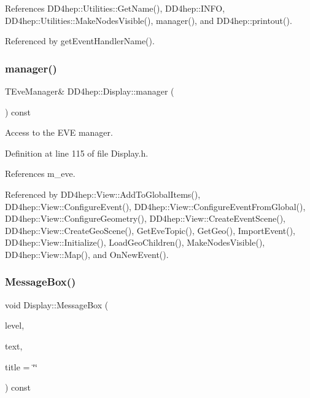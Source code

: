 References D\+D4hep\+::\+Utilities\+::\+Get\+Name(), D\+D4hep\+::\+I\+N\+FO, D\+D4hep\+::\+Utilities\+::\+Make\+Nodes\+Visible(), manager(), and D\+D4hep\+::printout().



Referenced by get\+Event\+Handler\+Name().

\hypertarget{class_d_d4hep_1_1_display_aab28a35f743661ba4f81856ffd22934a}{}\label{class_d_d4hep_1_1_display_aab28a35f743661ba4f81856ffd22934a} 
\subsubsection{\texorpdfstring{manager()}{manager()}}
{\footnotesize\ttfamily T\+Eve\+Manager\& D\+D4hep\+::\+Display\+::manager (\begin{DoxyParamCaption}{ }\end{DoxyParamCaption}) const\hspace{0.3cm}{\ttfamily [inline]}}



Access to the E\+VE manager. 



Definition at line 115 of file Display.\+h.



References m\+\_\+eve.



Referenced by D\+D4hep\+::\+View\+::\+Add\+To\+Global\+Items(), D\+D4hep\+::\+View\+::\+Configure\+Event(), D\+D4hep\+::\+View\+::\+Configure\+Event\+From\+Global(), D\+D4hep\+::\+View\+::\+Configure\+Geometry(), D\+D4hep\+::\+View\+::\+Create\+Event\+Scene(), D\+D4hep\+::\+View\+::\+Create\+Geo\+Scene(), Get\+Eve\+Topic(), Get\+Geo(), Import\+Event(), D\+D4hep\+::\+View\+::\+Initialize(), Load\+Geo\+Children(), Make\+Nodes\+Visible(), D\+D4hep\+::\+View\+::\+Map(), and On\+New\+Event().

\hypertarget{class_d_d4hep_1_1_display_aa34d0301bd5a0870194b8b8271c1d5ce}{}\label{class_d_d4hep_1_1_display_aa34d0301bd5a0870194b8b8271c1d5ce} 
\subsubsection{\texorpdfstring{Message\+Box()}{MessageBox()}}
{\footnotesize\ttfamily void Display\+::\+Message\+Box (\begin{DoxyParamCaption}\item[{\hyperlink{namespace_d_d4hep_a5b5a64d56252469451f2020a27d57d42}{Print\+Level}}]{level,  }\item[{const std\+::string \&}]{text,  }\item[{const std\+::string \&}]{title = {\ttfamily \char`\"{}\char`\"{}} }\end{DoxyParamCaption}) const}



